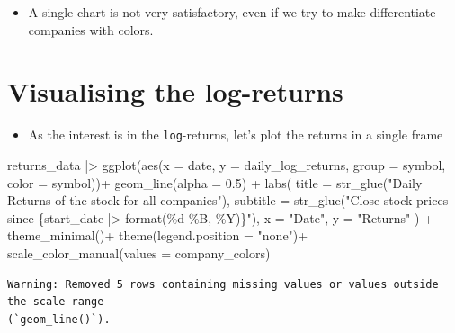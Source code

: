 \documentclass[
  letterpaper,
  DIV=11,
  numbers=noendperiod]{scrreprt}
\newenvironment{Shaded}{\begin{snugshade}}{\end{snugshade}}
\newcommand{\AttributeTok}[1]{\textcolor[rgb]{0.40,0.45,0.13}{#1}}
\newcommand{\FloatTok}[1]{\textcolor[rgb]{0.68,0.00,0.00}{#1}}
\newcommand{\FunctionTok}[1]{\textcolor[rgb]{0.28,0.35,0.67}{#1}}
\newcommand{\NormalTok}[1]{\textcolor[rgb]{0.00,0.23,0.31}{#1}}
\newcommand{\SpecialCharTok}[1]{\textcolor[rgb]{0.37,0.37,0.37}{#1}}
\newcommand{\StringTok}[1]{\textcolor[rgb]{0.13,0.47,0.30}{#1}}
\providecommand{\tightlist}{%
  \setlength{\itemsep}{0pt}\setlength{\parskip}{0pt}}\usepackage{longtable,booktabs,array}
\theoremstyle{definition}
\theoremstyle{remark}
\begin{document}
\begin{itemize}
\tightlist
\item
  A single chart is not very satisfactory, even if we try to make
  differentiate companies with colors.
\end{itemize}

\section{Visualising the log-returns}\label{visualising-the-log-returns}

\begin{itemize}
\tightlist
\item
  As the interest is in the \texttt{log}-returns, let's plot the returns
  in a single frame
\end{itemize}

\begin{Shaded}
\begin{Highlighting}[]
\NormalTok{returns\_data }\SpecialCharTok{|\textgreater{}} 
  \FunctionTok{ggplot}\NormalTok{(}\FunctionTok{aes}\NormalTok{(}\AttributeTok{x =}\NormalTok{ date, }\AttributeTok{y =}\NormalTok{ daily\_log\_returns,  }\AttributeTok{group =}\NormalTok{ symbol, }\AttributeTok{color =}\NormalTok{ symbol))}\SpecialCharTok{+}
  \FunctionTok{geom\_line}\NormalTok{(}\AttributeTok{alpha =} \FloatTok{0.5}\NormalTok{) }\SpecialCharTok{+}
  \FunctionTok{labs}\NormalTok{(}
    \AttributeTok{title =} \FunctionTok{str\_glue}\NormalTok{(}\StringTok{"Daily Returns of the stock for all companies"}\NormalTok{), }
    \AttributeTok{subtitle =} \FunctionTok{str\_glue}\NormalTok{(}\StringTok{"Close stock prices since \{start\_date |\textgreater{} format(\textquotesingle{}\%d \%B, \%Y\textquotesingle{})\}"}\NormalTok{),}
    \AttributeTok{x =} \StringTok{"Date"}\NormalTok{,}
    \AttributeTok{y =} \StringTok{"Returns"}
\NormalTok{    ) }\SpecialCharTok{+} 
  \FunctionTok{theme\_minimal}\NormalTok{()}\SpecialCharTok{+}
  \FunctionTok{theme}\NormalTok{(}\AttributeTok{legend.position =} \StringTok{"none"}\NormalTok{)}\SpecialCharTok{+} 
  \FunctionTok{scale\_color\_manual}\NormalTok{(}\AttributeTok{values =}\NormalTok{ company\_colors)}
\end{Highlighting}
\end{Shaded}

\begin{verbatim}
Warning: Removed 5 rows containing missing values or values outside the scale range
(`geom_line()`).
\end{verbatim}
\end{document}
